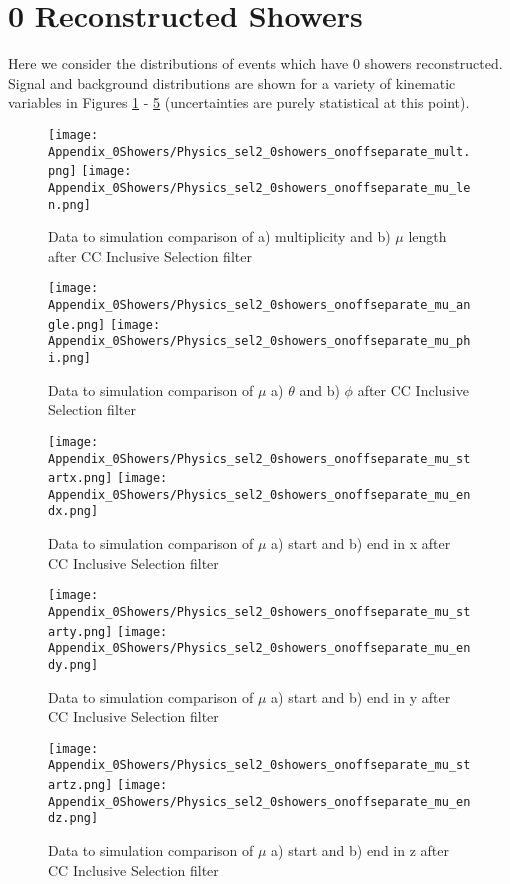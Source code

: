 \clearpage
\appendix
\clearpage

\section{0 Reconstructed Showers}
\label{sec:AppC}
Here we consider the distributions of events which have 0 showers reconstructed. Signal and background distributions are shown for a variety of kinematic variables in Figures \ref{fig:physics_sel2_0shower_mulen} - \ref{fig:physics_sel2_0shower_z} (uncertainties are purely statistical at this point). 

\begin{figure}[h!]
\centering
\texttt{[image: Appendix\_0Showers/Physics\_sel2\_0showers\_onoffseparate\_mult.png]}
\hspace{1 mm}
\texttt{[image: Appendix\_0Showers/Physics\_sel2\_0showers\_onoffseparate\_mu\_len.png]}
\caption{ Data to simulation comparison of a) multiplicity and b) $\mu$ length after CC Inclusive Selection filter }
\label{fig:physics_sel2_0shower_mulen}
\end{figure}

\begin{figure}[h!]
\centering
\texttt{[image: Appendix\_0Showers/Physics\_sel2\_0showers\_onoffseparate\_mu\_angle.png]}
\hspace{2 mm}
\texttt{[image: Appendix\_0Showers/Physics\_sel2\_0showers\_onoffseparate\_mu\_phi.png]}
\caption{ Data to simulation comparison of $\mu$ a) $\theta$  and b) $\phi$ after CC Inclusive Selection filter }
\label{fig:physics_sel2_0shower_muphi}
\end{figure}

\begin{figure}[h!]
\texttt{[image: Appendix\_0Showers/Physics\_sel2\_0showers\_onoffseparate\_mu\_startx.png]}
\texttt{[image: Appendix\_0Showers/Physics\_sel2\_0showers\_onoffseparate\_mu\_endx.png]}
\caption{ Data to simulation comparison of $\mu$ a) start and b) end in x after CC Inclusive Selection filter }
\label{fig:physics_sel2_0shower_x}
\end{figure}

\begin{figure}[h!]
\centering
\texttt{[image: Appendix\_0Showers/Physics\_sel2\_0showers\_onoffseparate\_mu\_starty.png]}
\texttt{[image: Appendix\_0Showers/Physics\_sel2\_0showers\_onoffseparate\_mu\_endy.png]}
\caption{ Data to simulation comparison of $\mu$ a) start and b) end in y after CC Inclusive Selection filter }
\label{fig:physics_sel2_0shower_y}
\end{figure}

\begin{figure}[h!]
\centering
\texttt{[image: Appendix\_0Showers/Physics\_sel2\_0showers\_onoffseparate\_mu\_startz.png]}
\texttt{[image: Appendix\_0Showers/Physics\_sel2\_0showers\_onoffseparate\_mu\_endz.png]}
\caption{ Data to simulation comparison of $\mu$ a) start and b) end in z after CC Inclusive Selection filter }
\label{fig:physics_sel2_0shower_z}
\end{figure}
